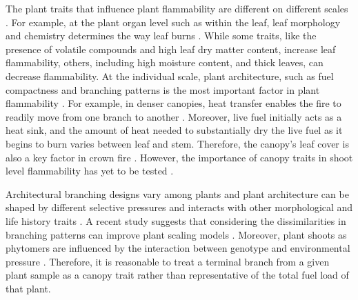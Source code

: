 \documentclass{ttuthes2007}
\begin{document}
The plant traits that influence plant flammability are different on different scales \citep{pausas2017flammability}. For example, at the plant organ level such as within  the leaf, leaf morphology and chemistry determines the way leaf burns \citep{anderson1970forest, owens1998seasonal, schwilk2011scaling, pausas2016secondary, guerrero2021leaf, ganteaume2021volatile,alam2020shoot}. While some traits, like the presence of volatile compounds and high leaf dry matter content, increase leaf flammability, others, including high moisture content, and thick leaves, can decrease flammability. At the individual scale, plant architecture, such as fuel compactness and branching patterns is %
the most important factor in plant flammability \citep{schwilk2003flammability, madrigal2012evaluation}. For example, in denser canopies, heat transfer enables the fire to readily move from one branch to another \citep{bond1996fire}. Moreover, live fuel initially acts as a heat sink, and the amount of heat needed to substantially dry the live fuel as it begins to burn varies between %
leaf and stem. Therefore, the canopy's leaf cover is  also a key factor in crown fire \citep{ray2005micrometeorological}. However, the importance of canopy traits in shoot level flammability has yet to be tested \citep{alam2020shoot}.



Architectural branching designs vary among plants \citep{halle2012tropical} and plant architecture can be shaped by different selective pressures \citep{danell1994browseeffects, schwilk2003flammability} and interacts with other morphological and life history traits \citep{ackerly1998leaf, schwilk2001flammability,archibald2003growing}. A recent study suggests that considering the dissimilarities in branching patterns can improve plant scaling models \citep{bentley2013empirical}. Moreover, plant shoots as phytomers are influenced by the interaction between genotype and environmental pressure \citep{mcsteen2005shoot, wang2008molecular}. Therefore, it is reasonable to treat a terminal branch from a given plant sample as a canopy trait rather than representative of the total fuel load of that plant.

\end{document}
